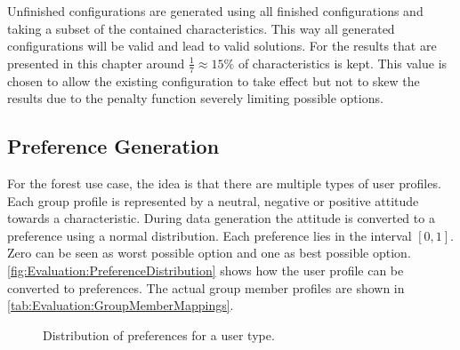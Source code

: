 Unfinished configurations are generated using all finished configurations and taking a subset of the contained characteristics. This way all generated configurations will be valid and lead to valid solutions. For the results that are presented in this chapter around $\frac{1}{7} \approx 15\%$ of characteristics is kept. This value is chosen to allow the existing configuration to take effect but not to skew the results due to the penalty function severely limiting possible options.

\subsection{Preference Generation}

For the forest use case, the idea is that there are multiple types of user profiles. Each group profile is represented by a neutral, negative or positive attitude towards a characteristic. During data generation the attitude is converted to a preference using a normal distribution. Each preference lies in the interval $[0,1]$. Zero can be seen as worst possible option and one as best possible option.  \autoref{fig:Evaluation:PreferenceDistribution} shows how the user profile can be converted to preferences. The actual group member profiles are shown in \autoref{tab:Evaluation:GroupMemberMappings}.

\pgfplotsset{height=5cm,width=\textwidth,compat=1.8}
\begin{figure}
 \caption{Distribution of preferences for a user type.}
\label{fig:Evaluation:PreferenceDistribution}
\end{figure}



